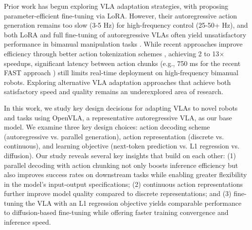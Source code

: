 \documentclass[conference]{IEEEtran}
\begin{document}
Prior work has begun exploring VLA adaptation strategies, with \citet{kim2024openvla} proposing parameter-efficient fine-tuning via LoRA. However, their autoregressive action generation remains too slow (3-5 Hz) for high-frequency control (25-50+ Hz), and both LoRA and full fine-tuning of autoregressive VLAs often yield unsatisfactory performance in bimanual manipulation tasks \citep{wen2024tinyvla, liu2024rdt, black2024pi_0}. While recent approaches improve efficiency through better action tokenization schemes \citep{belkhale2024minivla, pertsch2025fastefficientactiontokenization}, achieving 2 to 13$\times$ speedups, significant latency between action chunks (e.g., 750 ms for the recent FAST approach \citep{pertsch2025fastefficientactiontokenization}) still limits real-time deployment on high-frequency bimanual robots. Exploring alternative VLA adaptation approaches that achieve both satisfactory speed and quality remains an underexplored area of research.

In this work, we study key design decisions for adapting VLAs to novel robots and tasks using OpenVLA, a representative autoregressive VLA, as our base model. We examine three key design choices: action decoding scheme (autoregressive vs. parallel generation), action representation (discrete vs. continuous), and learning objective (next-token prediction vs. L1 regression vs. diffusion). Our study reveals several key insights that build on each other: (1) parallel decoding with action chunking not only boosts inference efficiency but also improves success rates on downstream tasks while enabling greater flexibility in the model's input-output specifications; (2) continuous action representations further improve model quality compared to discrete representations; and (3) fine-tuning the VLA with an L1 regression objective yields comparable performance to diffusion-based fine-tuning while offering faster training convergence and inference speed.
\end{document}
